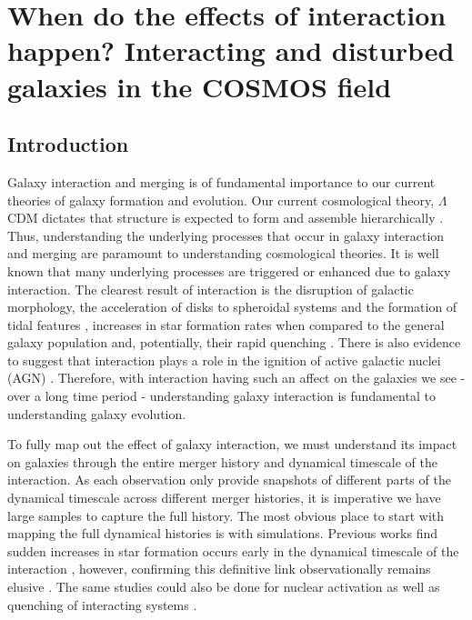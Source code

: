 \chapter{When do the effects of interaction happen? Interacting and disturbed galaxies in the COSMOS field}\label{chapter3}
\section{Introduction}\label{introduction}
\noindent Galaxy interaction and merging is of fundamental importance to our current theories of galaxy formation and evolution. Our current cosmological theory, $\Lambda$CDM dictates that structure is expected to form and assemble hierarchically \citep{1978MNRAS.183..341W, 2001MNRAS.328..726S, 2013MNRAS.436.1765M}. Thus, understanding the underlying processes that occur in galaxy interaction and merging are paramount to understanding cosmological theories. It is well known that many underlying processes are triggered or enhanced due to galaxy interaction. The clearest result of interaction is the disruption of galactic morphology, the acceleration of disks to spheroidal systems and the formation of tidal features \citep{1972ApJ...178..623T, 1977ApJ...212..616T, 2005MNRAS.357..753G, 2009MNRAS.397..802H}, increases in star formation rates when compared to the general galaxy population \citep{1991ApJ...370L..65B, 2006ApJ...652...56B, 2014MNRAS.437.2137S, 2015ApJ...807L..16K} and, potentially, their rapid quenching \citep{2013MNRAS.430.1901H, 2023RAA....23i5026D}. There is also evidence to suggest that interaction plays a role in the ignition of active galactic nuclei (AGN) \citep{2011MNRAS.418.2043E, 2015ApJ...806..219C, 2023MNRAS.523.4164H}. Therefore, with interaction having such an affect on the galaxies we see - over a long time period - understanding galaxy interaction is fundamental to understanding galaxy evolution.

To fully map out the effect of galaxy interaction, we must understand its impact on galaxies through the entire merger history and dynamical timescale of the interaction. As each observation only provide snapshots of different parts of the dynamical timescale across different merger histories, it is imperative we have large samples to capture the full history. The most obvious place to start with mapping the full dynamical histories is with simulations. Previous works find sudden increases in star formation occurs early in the dynamical timescale of the interaction \citep{2008MNRAS.384..386C, 2019MNRAS.490.2139R}, however, confirming this definitive link observationally remains elusive \citep{2023ApJ...958...96R}. The same studies could also be done for nuclear activation as well as quenching of interacting systems \citep{2011MNRAS.418.2043E, 2018PASJ...70S..37G, 2023ApJ...942..107S}. 

